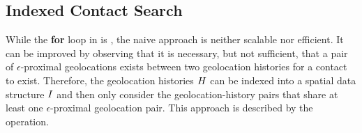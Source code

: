 
\subsection{Indexed Contact Search}

While the \textbf{for} loop in  is  \cite[p. 14]{Herlihy2012}, the naive approach is neither scalable nor efficient. It can be improved by observing that it is necessary, but not sufficient, that a pair of $\epsilon$-proximal geolocations exists between two geolocation histories for a contact to exist. Therefore, the geolocation histories $H$ can be indexed into a spatial data structure $I$ \citep{Mokbel2003, Dinh2010, Mahmood2019} and then only consider the geolocation-history pairs that share at least one $\epsilon$-proximal geolocation pair. This approach is described by the  operation.

